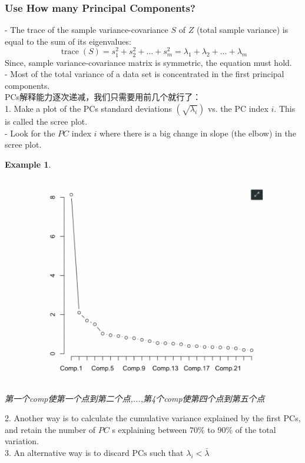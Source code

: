 \documentclass[11pt,a4paper]{article}
\newtheorem{example}{Example}
\begin{document}
\subsubsection{Use How many Principal Components?}
- The trace of the sample variance-covariance $S$ of $Z$ (total sample variance) is equal to the sum of its eigenvalues:
$$
\operatorname{trace}(S)=s_{1}^{2}+s_{2}^{2}+\ldots+s_{m}^{2}=\lambda_{1}+\lambda_{2}+\ldots+\lambda_{m}
$$
Since, sample variance-covariance matrix is symmetric, the equation must hold.\\
- Most of the total variance of a data set is concentrated in the first principal components.\\
PCs解释能力逐次递减，我们只需要用前几个就行了：\\
1. Make a plot of the PCs standard deviations $\left(\sqrt{\lambda_{i}}\right)$ vs. the PC index $i$. This is called the scree plot.\\
- Look for the $P C$ index $i$ where there is a big change in slope (the elbow) in the scree plot.\\
\begin{example}
\begin{center}\begin{figure}[htbp]
    \centering
    \includegraphics[scale=0.5]{elbow}
    \caption{}
    \label{}
\end{figure}\end{center}
第一个comp使第一个点到第二个点,...,第4个comp使第四个点到第五个点
\end{example}
2. Another way is to calculate the cumulative variance explained by the first PCs, and retain the number of $P C$ s explaining between $70 \%$ to $90 \%$ of the total variation.\\
3. An alternative way is to discard $\mathrm{PCs}$ such that $\lambda_{i}<\bar{\lambda}$
\end{document}
